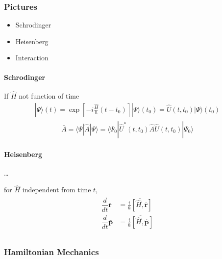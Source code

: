 \documentclass[letterpaper,10pt,english]{jupyterBook}
\begin{document}
\subsubsection{Pictures}
\label{\detokenize{ch/quantum-mechanics/intro:pictures}}\begin{itemize}
\item {} 
\sphinxAtStartPar
Schrodinger

\item {} 
\sphinxAtStartPar
Heisenberg

\item {} 
\sphinxAtStartPar
Interaction

\end{itemize}


\paragraph{Schrodinger}
\label{\detokenize{ch/quantum-mechanics/intro:schrodinger}}
\sphinxAtStartPar
If \(\hat{H}\) not function of time
\begin{equation*}
\begin{split}| \Psi \rangle (t) = \exp\left[ - i \frac{\hat{H}}{\hbar} (t-t_0) \right] | \Psi \rangle(t_0) = \hat{U}(t,t_0) | \Psi \rangle(t_0) \end{split}
\end{equation*}\begin{equation*}
\begin{split}\bar{A} = \langle \Psi | \hat{A} | \Psi \rangle = \langle \Psi_0 | \hat{U}^*(t,t_0) \hat{A} \hat{U}(t,t_0) | \Psi_0 \rangle\end{split}
\end{equation*}

\paragraph{Heisenberg}
\label{\detokenize{ch/quantum-mechanics/intro:heisenberg}}
\sphinxAtStartPar
…

\sphinxAtStartPar
for \(\hat{H}\) independent from time \(t\),
\begin{equation*}
\begin{split}\begin{aligned}
  \dfrac{d}{dt} \bar{\mathbf{r}} & = \overline{\frac{i}{\hbar} \left[ \hat{H}, \hat{\mathbf{r}} \right]} \\
  \dfrac{d}{dt} \bar{\mathbf{p}} & = \overline{\frac{i}{\hbar} \left[ \hat{H}, \hat{\mathbf{p}} \right]} \\
\end{aligned}\end{split}
\end{equation*}\subsubsection*{Hamiltonian Mechanics}
\end{document}
